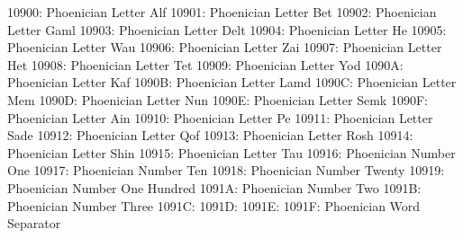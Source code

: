 10900: Phoenician Letter Alf
10901: Phoenician Letter Bet
10902: Phoenician Letter Gaml
10903: Phoenician Letter Delt
10904: Phoenician Letter He
10905: Phoenician Letter Wau
10906: Phoenician Letter Zai
10907: Phoenician Letter Het
10908: Phoenician Letter Tet
10909: Phoenician Letter Yod
1090A: Phoenician Letter Kaf
1090B: Phoenician Letter Lamd
1090C: Phoenician Letter Mem
1090D: Phoenician Letter Nun
1090E: Phoenician Letter Semk
1090F: Phoenician Letter Ain
10910: Phoenician Letter Pe
10911: Phoenician Letter Sade
10912: Phoenician Letter Qof
10913: Phoenician Letter Rosh
10914: Phoenician Letter Shin
10915: Phoenician Letter Tau
10916: Phoenician Number One
10917: Phoenician Number Ten
10918: Phoenician Number Twenty
10919: Phoenician Number One Hundred
1091A: Phoenician Number Two
1091B: Phoenician Number Three
1091C:
1091D:
1091E:
1091F: Phoenician Word Separator